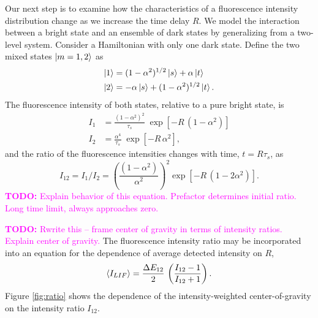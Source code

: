 \documentclass[12pt,draft]{mitthesis}
\newcommand{\TODO} [1]{\textcolor{magenta}{\textbf{TODO:} #1}}
\begin{document}
Our next step is to examine how the characteristics of a
fluorescence intensity distribution change as we increase the time delay
$R$.  We model the interaction between a bright state and an
ensemble of dark states by generalizing from a two-level system.
Consider a Hamiltonian with only one dark state.  Define the two mixed
states $\mathinner{|{m=1,2}\rangle}$ as
\begin{equation}
  \begin{split}
    \mathinner{|{1}\rangle} &=  (1 - \alpha^2)^{1/2} \mathinner{|{s}\rangle} + \alpha \mathinner{|{t}\rangle}\\
    \mathinner{|{2}\rangle} &= -\alpha \mathinner{|{s}\rangle} + (1 - \alpha^2)^{1/2} \mathinner{|{t}\rangle}.
  \end{split}
\end{equation}
The fluorescence intensity of both states, relative to a pure bright
state, is
\begin{equation}
  \begin{split}
    I_1 &= \frac{(1 - \alpha^2)^2}{\tau_s} \; \exp 
          \left[
            - R \, (1 - \alpha^2)
          \right]\\
    I_2 &= \frac{\alpha^4}{\tau_s} \; \exp 
          \left[
            - R \, \alpha^2
          \right],
  \end{split}
\end{equation}
and the ratio of the fluorescence intensities changes with time,
$t=R\tau_s$, as
\begin{equation}
  I_{12} = I_1 / I_2 = 
  \left(
    \frac{(1 - \alpha^2)}{\alpha^2}
  \right)^2
  \exp
  \left[
    - R \, (1 - 2\alpha^2)
  \right].
\end{equation}  \TODO{Explain behavior of this equation.  Prefactor
  determines initial ratio.  Long time limit, always approaches zero.}

\TODO{Rwrite this -- frame center of gravity in terms of intensity
  ratios.  Explain center of gravity.}  The fluorescence intensity
ratio may be incorporated into an equation for the dependence of
average detected intensity on $R$,
\begin{equation}
  \label{eq:ratio}
  \mathinner{\langle{I_{LIF}}\rangle} = 
  \frac{\Delta E_{12}}{2} \,
  \left(
    \frac{I_{12}-1}{I_{12}+1}
  \right).
\end{equation}
Figure \ref{fig:ratio} shows the dependence of the intensity-weighted
center-of-gravity on the intensity ratio $I_{12}$.
\end{document}
